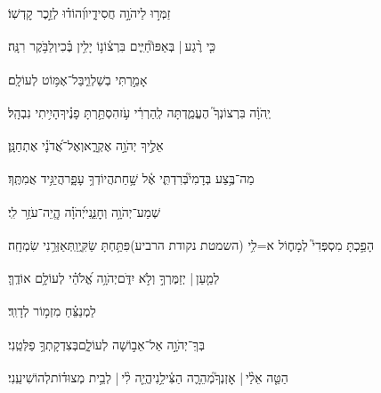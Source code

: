 \documentclass[12pt]{article}
\newcommand{\loc}[1]{\textsuperscript{\locf{#1}}}
\begin{document}
{\loc{ ה}~}‏זַמְּר֣וּ לַיהֹוָ֣ה חֲסִידָ֑יו{\hfill}וְ֝הוֹד֗וּ לְזֵ֣כֶר קׇדְשֽׁוֹ׃\par

{\loc{ ו}~}‏כִּ֤י רֶ֨גַע |  בְּאַפּוֹ֮{\hfill}חַיִּ֢ים בִּרְצ֫וֹנ֥וֹ\newline\hspace*{.5em} יָלִ֥ין בֶּ֗כִי{\hfill}וְלַבֹּ֥קֶר רִנָּֽה׃\par

{\loc{ ז}~}‏ אָמַ֣רְתִּי בְשַׁלְוִ֑י{\hfill}בַּל־אֶמּ֥וֹט לְעוֹלָֽם׃\par

{\loc{ ח}~}‏יְֽהֹוָ֗ה בִּרְצוֹנְךָ֮ הֶעֱמַ֢דְתָּה לְֽהַרְרִ֫י עֹ֥ז{\hfill}הִסְתַּ֥רְתָּ פָנֶ֗יךָ{\hfill}הָיִ֥יתִי נִבְהָֽל׃\par

{\loc{ ט}~}‏אֵלֶ֣יךָ יְהֹוָ֣ה אֶקְרָ֑א{\hfill}וְאֶל־אֲ֝דֹנָ֗י אֶתְחַנָּֽן׃\par

{\loc{ י}~}‏מַה־בֶּ֥צַע בְּדָמִי֮{\hfill}בְּרִדְתִּ֢י אֶ֫ל שָׁ֥חַת\newline\hspace*{.5em}הֲיוֹדְךָ֥ עָפָ֑ר{\hfill}הֲיַגִּ֥יד אֲמִתֶּֽךָ׃\par

{\loc{ יא}~}‏שְׁמַע־יְהֹוָ֥ה וְחׇנֵּ֑נִי{\hfill}יְ֝הֹוָ֗ה הֱֽיֵה־עֹזֵ֥ר לִֽי׃\par

{\loc{ יב}~}‏הָפַ֣כְתָּ מִסְפְּדִי֮ לְמָח֢וֹל א=לִ֥י (השמטת נקודת הרביע){\hfill}פִּתַּ֥חְתָּ שַׂקִּ֑י{\hfill}וַֽתְּאַזְּרֵ֥נִי שִׂמְחָֽה׃\par

{\loc{ יג}~}‏לְמַ֤עַן |  יְזַמֶּרְךָ֣  וְלֹ֣א יִדֹּ֑ם{\hfill}יְהֹוָ֥ה אֱ֝לֹהַ֗י לְעוֹלָ֥ם אוֹדֶֽךָּ׃\par\pend
\ledpb
\pstart[\subsection*{\textcolor{red}{פרק לא}}]\label{פרק לא}
{\loc{ א}~}‏לַמְנַצֵּ֗חַ מִזְמ֥וֹר לְדָוִֽד׃\par

{\loc{ ב}~}‏בְּךָֽ־יְהֹוָ֣ה {\hfill}אַל־אֵב֣וֹשָׁה לְעוֹלָ֑ם\newline\hspace*{.5em}בְּצִדְקָתְךָ֥ פַלְּטֵֽנִי׃\par

{\loc{ ג}~}‏הַטֵּ֤ה אֵלַ֨י |  אׇזְנְךָ֮{\hfill}מְהֵרָ֢ה הַצִּ֫ילֵ֥נִי\newline\hspace*{.5em}הֱיֵ֤ה לִ֨י |   לְבֵ֥ית מְצוּד֗וֹת{\hfill}לְהוֹשִׁיעֵֽנִי׃\par
\end{document}
